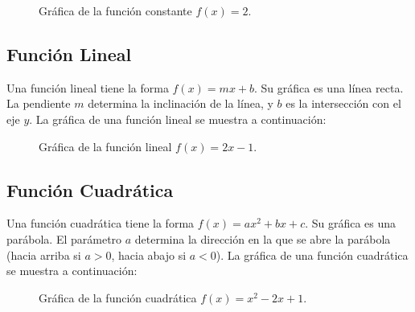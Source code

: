 \begin{figure}[h!]
\centering
{}
\caption{Gráfica de la función constante $f(x) = 2$.}
\end{figure}

\subsection{Función Lineal}

Una función lineal tiene la forma \( f(x) = mx + b \). Su gráfica es una línea recta. La pendiente \( m \) determina la inclinación de la línea, y \( b \) es la intersección con el eje \( y \). La gráfica de una función lineal se muestra a continuación:

\begin{figure}[h!]
\centering
{}
\caption{Gráfica de la función lineal $f(x) = 2x - 1$.}
\end{figure}

\subsection{Función Cuadrática}

Una función cuadrática tiene la forma \( f(x) = ax^2 + bx + c \). Su gráfica es una parábola. El parámetro \( a \) determina la dirección en la que se abre la parábola (hacia arriba si \( a > 0 \), hacia abajo si \( a < 0 \)). La gráfica de una función cuadrática se muestra a continuación:

\begin{figure}[h!]
\centering
{}
\caption{Gráfica de la función cuadrática $f(x) = x^2 - 2x + 1$.}
\end{figure}


